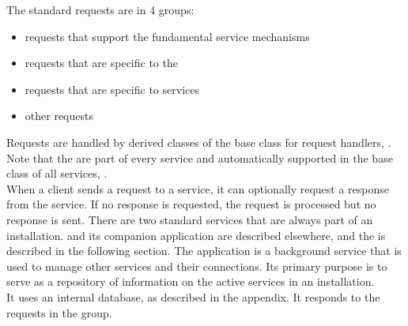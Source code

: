 The standard requests are in 4 groups:
\begin{itemize}
\item\textbf{} requests that support the
fundamental \mplusm{} service mechanisms
\item\exSp\textbf{}
requests that are specific to the 
\item\exSp\textbf{} requests
that are specific to  services
\item\exSp\textbf{} other
requests
\end{itemize}
Requests are handled by derived classes of the base class for request handlers,
.
Note that the  are part of every service and
automatically supported in the base class of all services,
.\\

When a client sends a request to a service, it can optionally request a response from the
service.
If no response is requested, the request is processed but no response is sent.
There are two standard services that are always part of an \mplusm{} installation.
 and its companion application
 are described elsewhere, and the
 is described in the following section.
The  application is a background service
that is used to manage other services and their connections.
Its primary purpose is to serve as a repository of information on the active services in
an \mplusm{} installation.\\

It uses an internal database, as described in the
 appendix.
It responds to the requests in the
 group.\\

